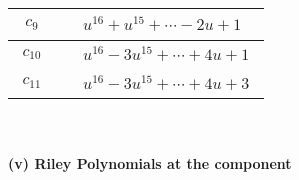 \documentclass[1p]{elsarticle_modified}
\theoremstyle{definition}
\begin{document}
\begin{tabular}{m{50pt}|m{274pt}}
\hline $$\begin{aligned}c_{9}\end{aligned}$$&$\begin{aligned}
&u^{16}+u^{15}+\cdots-2 u+1
\end{aligned}$\\
\hline $$\begin{aligned}c_{10}\end{aligned}$$&$\begin{aligned}
&u^{16}-3 u^{15}+\cdots+4 u+1
\end{aligned}$\\
\hline $$\begin{aligned}c_{11}\end{aligned}$$&$\begin{aligned}
&u^{16}-3 u^{15}+\cdots+4 u+3
\end{aligned}$\\
\hline
\end{tabular}\\~\\
\newpage\renewcommand{\arraystretch}{1}
\flushleft \textbf{(v) Riley Polynomials at the component}\newline \\
\end{document}

